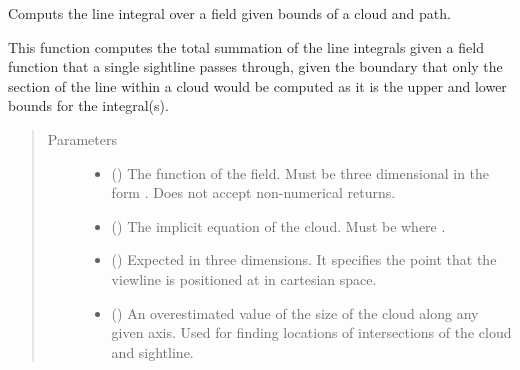 \documentclass[letterpaper,10pt,english]{sphinxmanual}
\begin{document}
\begin{fulllineitems}
\label{\detokenize{Backend.cloud_line_integration:Backend.cloud_line_integration.cloud_line_integral}}
Computs the line integral over a field given bounds of a cloud and path.

This function computes the total summation of the line integrals given
a field function that a single sightline passes through, given the
boundary that only the section of the line within a cloud would be
computed as it is the upper and lower bounds for the integral(s).
\begin{quote}\begin{description}
\item[{Parameters}] \leavevmode\begin{itemize}
\item {} 
 () \textendash{} The function of the field. Must be three dimensional in the form
. Does not accept non-numerical returns.

\item {} 
 () \textendash{} The implicit equation of the cloud. Must be  where
.

\item {} 
 () \textendash{} Expected in three dimensions. It specifies the point that the viewline
is positioned at in cartesian space.

\item {} 
 () \textendash{} An overestimated value of the size of the cloud along any given axis.
Used for finding locations of intersections of the cloud and sightline.


\end{itemize}
\end{description}
\end{quote}
\end{fulllineitems}
\end{document}
